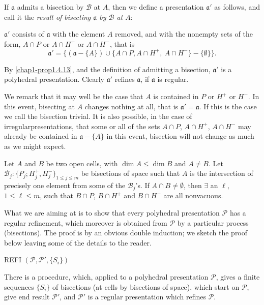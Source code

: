 If $\mathfrak{a}$ admits a bisection by $\mathscr{B}$ at $A$, then we define a presentation $\mathfrak{a}'$ as follows, and call it the {\em result of bisecting $\mathfrak{a}$ by $\mathscr{B}$ at $A$}:

$\mathfrak{a}'$ consists of $\mathfrak{a}$ with the element $A$ removed, and with the nonempty sets of the form, $A\cap P$ or $A\cap H^{+}$ or $A\cap H^{-}$, that is 
$$
\mathfrak{a}'=\Big\{(\mathfrak{a}-\{A\})\cup \{A\cap P, A\cap H^{+},\ A\cap H^{-}\}-\{\emptyset\}\Big\}.
$$

By \ref{chap1-prop1.4.13}, and the definition of admitting a bisection, $\mathfrak{a}'$ is a polyhedral presentation. Clearly $\mathfrak{a}'$ refines $\mathfrak{a}$, if $\mathfrak{a}$ is regular.

We remark that it may well be the case that $A$ is contained in $P$ or $H^{+}$ or $H^{-}$. In this event, bisecting at $A$ changes nothing at all, that is $\mathfrak{a}'=\mathfrak{a}$. If this is the case we call the bisection {\rm trivial}. It is also possible, in the case of irregular\pageoriginale presentations, that some or all of the sets $A\cap P$, $A\cap H^{+}$, $A\cap H^{-}$ may already be contained in $\mathfrak{a}-\{A\}$ in this event, bisection will not change as much as we might expect.

\begin{ex}\label{chap1-ex1.7.2}
Let $A$ and $B$ be two open cells, with $\dim A \leq \dim B$ and $A\neq B$. Let $\mathscr{B}_{j}:\{P_{j};H^{+}_{j},H^{-}_{j}\}_{1\leq j\leq m}$ be bisections of space such that $A$ is the intersection of precisely one element from some of the $\mathscr{B}_{j}$'s. If $A\cap B\neq \emptyset$, then $\exists$ an $\ell$, $1\leq \ell\leq m$, such that $B\cap P$, $B\cap H^{+}$ and $B\cap H^{-}$ are all nonvacuous.
\end{ex}

What we are aiming at is to show that every polyhedral presentation $\mathscr{P}$ has a regular refinement, which moreover is obtained from $\mathscr{P}$ by a particular process (bisections). The proof is by an obvious double induction; we sketch the proof below leaving some of the details to the reader.

\begin{proposition}\label{chap1-prop1.7.3}
REFI $(\mathscr{P},\mathscr{P}',\{S_{i}\})$

There is a procedure, which, applied to a polyhedral presentation $\mathscr{P}$, gives a finite sequences $\{S_{i}\}$ of bisections (at cells by bisections of space), which start on $\mathscr{P}$, give end result $\mathscr{P}'$, and $\mathscr{P}'$ is a regular presentation which refines $\mathscr{P}$. 
\end{proposition}

